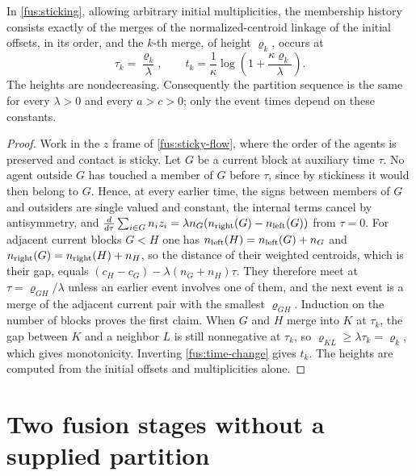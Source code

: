 In \cref{fus:sticking}, allowing arbitrary initial multiplicities, the
membership history consists exactly of the merges of the normalized-centroid
linkage of the initial offsets, in its order, and the $k$-th merge, of
height $\varrho_k$, occurs at
\begin{equation}
 \tau_k=\frac{\varrho_k}\lambda,\qquad
 t_k=\frac1\kappa\log\left(1+\frac{\kappa\varrho_k}{\lambda}\right).
 \label{fus:ncl-times}
\end{equation}
The heights are nondecreasing. Consequently the partition sequence is the
same for every $\lambda>0$ and every $a>c>0$; only the event times depend on
these constants.
\begin{proof}
Work in the $z$ frame of \cref{fus:sticky-flow}, where the order of the
agents is preserved and contact is sticky. Let $G$ be a current block at
auxiliary time $\tau$. No agent outside $G$ has touched a member of $G$
before $\tau$, since by stickiness it would then belong to $G$. Hence, at
every earlier time, the signs between members of $G$ and outsiders are single
valued and constant, the internal terms cancel by antisymmetry, and
$\frac{d}{d\tau}\sum_{i\in G}n_iz_i=\lambda n_G(n_{\rm right}(G)-n_{\rm left}(G))$
from $\tau=0$. For adjacent current blocks $G<H$ one has
$n_{\rm left}(H)=n_{\rm left}(G)+n_G$ and $n_{\rm right}(G)=n_{\rm right}(H)+n_H$,
so the distance of their weighted centroids, which is their gap, equals
$(c_H-c_G)-\lambda(n_G+n_H)\tau$. They therefore meet at
$\tau=\varrho_{GH}/\lambda$ unless an earlier event involves one of them, and
the next event is a merge of the adjacent current pair with the smallest
$\varrho_{GH}$. Induction on the number of blocks proves the first claim.
When $G$ and $H$ merge into $K$ at $\tau_k$, the gap between $K$ and a
neighbor $L$ is still nonnegative at $\tau_k$, so
$\varrho_{KL}\geq\lambda\tau_k=\varrho_k$, which gives monotonicity.
Inverting \cref{fus:time-change} gives $t_k$. The heights are computed from
the initial offsets and multiplicities alone.
\end{proof}

\section{Two fusion stages without a supplied partition}

